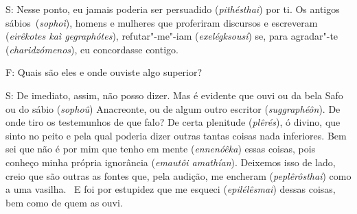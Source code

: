 S: Nesse ponto, eu jamais poderia ser persuadido (\emph{pithésthai}) por
ti. Os antigos sábios~(\emph{sophoì}), homens e mulheres que proferiram
discursos e escreveram (\emph{eirêkotes kaì gegraphótes}),
refutar"-me"-iam (\emph{exelégksousí}) se, para agradar"-te
(\emph{charidzómenos}), eu concordasse contigo.

\bekker{[235c]} F: Quais são eles e onde ouviste algo superior?

S: De imediato, assim, não posso dizer. Mas é evidente que ouvi ou da
bela Safo ou do sábio (\emph{sophoû}) Anacreonte, ou de algum outro
escritor (\emph{suggraphéôn}). De onde tiro os testemunhos de que falo?
De certa plenitude (\emph{plêrés}), ó divino, que sinto no peito e pela
qual poderia dizer outras tantas coisas nada inferiores. Bem sei que não
é por mim que tenho em mente (\emph{ennenóêka}) essas coisas, pois
conheço minha própria ignorância (\emph{emautôi amathían}). Deixemos
isso de lado, creio que são outras as fontes que, pela audição, me
encheram (\emph{peplêrôsthai}) como a uma vasilha.~\bekker{[235d]} E foi por
estupidez que me esqueci (\emph{epilélêsmai}) dessas coisas, bem como de
quem as ouvi.

